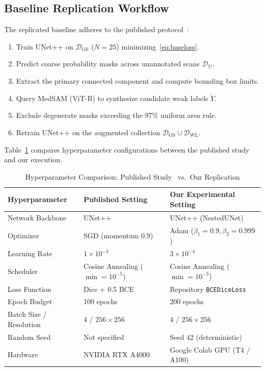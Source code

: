 \documentclass[journal,11pt,onecolumn,draftclsnofoot]{IEEEtran}
\begin{document}
\subsection{Baseline Replication Workflow}
The replicated baseline adheres to the published protocol~\cite{deshpande2024}:
\begin{enumerate}
    \item Train UNet++ on $\mathcal{D}_{\text{GS}}$ ($N=25$) minimizing~\eqref{eq:baseloss}.
    \item Predict coarse probability masks across unannotated scans $\mathcal{D}_{\text{U}}$.
    \item Extract the primary connected component and compute bounding box limits.
    \item Query MedSAM (ViT-B) to synthesize candidate weak labels $\tilde{Y}$.
    \item Exclude degenerate masks exceeding the 97\% uniform area rule.
    \item Retrain UNet++ on the augmented collection $\mathcal{D}_{\text{GS}} \cup \mathcal{D}_{\text{WL}}$.
\end{enumerate}

Table~\ref{tab:setup} compares hyperparameter configurations between the published study and our execution.

\begin{table}[t]
\renewcommand{\arraystretch}{1.15}
\caption{Hyperparameter Comparison: Published Study~\cite{deshpande2024} vs.\ Our Replication}
\label{tab:setup}
\centering\footnotesize
\begin{tabular}{@{}lll@{}}
\toprule
Hyperparameter & Published Setting~\cite{deshpande2024} & Our Experimental Setting \\
\midrule
Network Backbone & UNet++ & UNet++ (NestedUNet) \\
Optimizer & SGD (momentum 0.9) & Adam ($\beta_1=0.9, \beta_2=0.999$) \\
Learning Rate & $1 \times 10^{-3}$ & $3 \times 10^{-4}$ \\
Scheduler & Cosine Annealing ($\min = 10^{-5}$) & Cosine Annealing ($\min = 10^{-5}$) \\
Loss Function & Dice + 0.5 BCE & Repository \texttt{BCEDiceLoss} \\
Epoch Budget & 100 epochs & 200 epochs \\
Batch Size / Resolution & 4 / $256 \times 256$ & 4 / $256 \times 256$ \\
Random Seed & Not specified & Seed 42 (deterministic) \\
Hardware & NVIDIA RTX A4000 & Google Colab GPU (T4 / A100) \\
\bottomrule
\end{tabular}
\end{table}
\end{document}
